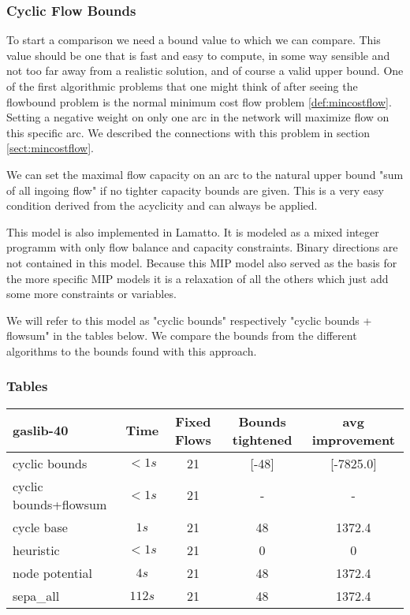 \subsubsection{Cyclic Flow Bounds}%
\label{model:cyclicFlow}
To start a comparison we need a bound value to which we can compare. This value should be one that is fast and 
easy to compute, in some way sensible and not too far away from a realistic solution, and of course a valid upper 
bound. 
One of the first algorithmic problems that one might think of after seeing the flowbound problem is the normal minimum 
cost flow problem \ref{def:mincostflow}. Setting a negative weight on only one arc in the network will 
maximize flow on this specific arc. We described the connections with this problem in section \ref{sect:mincostflow}. 

We can set the maximal flow capacity on an arc to the natural upper bound "sum of all ingoing flow" if no tighter 
capacity bounds are given. This is a very easy condition derived from the acyclicity and can always be applied.

This model is also implemented in Lamatto. It is modeled as a mixed integer programm with only flow balance and 
capacity constraints. Binary directions are not contained in this model. Because this MIP model also served as the 
basis for the more specific MIP models it is a relaxation of all the others which just add some more constraints or 
variables.

We will refer to this model as "cyclic bounds" respectively "cyclic bounds + flowsum" in the tables below. We compare 
the bounds from the different algorithms to the bounds found with this approach. 


\subsubsection{Tables}
\begin{center}

\begin{tabular}{ l | c | c | c | c }
\textbf{gaslib-40} & Time  & Fixed Flows & Bounds tightened & avg improvement\\
\hline
 cyclic bounds& $<1s$ & 21 & [-48] & [-7825.0] \\
 cyclic bounds+flowsum& $<1s$ & 21 & - & - \\
 cycle base& $1s$ & 21 & 48 & 1372.4\\
 heuristic& $<1s$& 21& 0 & 0\\
 node potential& $4s$ & 21 & 48 & 1372.4 \\ 
 sepa\_all& $112s$ & 21 & 48 & 1372.4\\
\end{tabular} 
\end{center}

